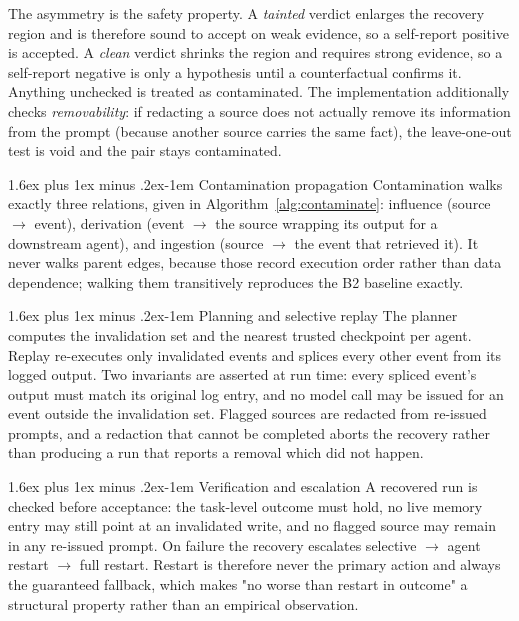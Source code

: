 \documentclass[10pt,twocolumn,a4paper]{article}
\makeatletter
\renewcommand{\subsubsection}{\@startsection{subsubsection}{3}{\z@}%
  {1.6ex plus 1ex minus .2ex}{-1em}%
  {\normalfont\normalsize\itshape}}
\newcommand{\btwo}{B2}
\makeatother
\begin{document}
The asymmetry is the safety property. A \textit{tainted} verdict enlarges the
recovery region and is therefore sound to accept on weak evidence, so a
self-report positive is accepted. A \textit{clean} verdict shrinks the region
and requires strong evidence, so a self-report negative is only a hypothesis
until a counterfactual confirms it. Anything unchecked is treated as
contaminated. The implementation additionally checks \emph{removability}: if
redacting a source does not actually remove its information from the prompt
(because another source carries the same fact), the leave-one-out test is void
and the pair stays contaminated.

\subsubsection{Contamination propagation}
\label{sec:prop}
Contamination walks exactly three relations, given in
Algorithm~\ref{alg:contaminate}: influence (source $\rightarrow$ event),
derivation (event $\rightarrow$ the source wrapping its output for a downstream
agent), and ingestion (source $\rightarrow$ the event that retrieved it). It
never walks parent edges, because those record execution order rather than data
dependence; walking them transitively reproduces the \btwo{} baseline exactly.

\subsubsection{Planning and selective replay}
The planner computes the invalidation set and the nearest trusted checkpoint
per agent. Replay re-executes only invalidated events and splices every other
event from its logged output. Two invariants are asserted at run time: every
spliced event's output must match its original log entry, and no model call may
be issued for an event outside the invalidation set. Flagged sources are
redacted from re-issued prompts, and a redaction that cannot be completed
aborts the recovery rather than producing a run that reports a removal which
did not happen.

\subsubsection{Verification and escalation}
\label{sec:verify}
A recovered run is checked before acceptance: the task-level outcome must hold,
no live memory entry may still point at an invalidated write, and no flagged
source may remain in any re-issued prompt. On failure the recovery escalates
selective $\rightarrow$ agent restart $\rightarrow$ full restart. Restart is
therefore never the primary action and always the guaranteed fallback, which
makes "no worse than restart in outcome" a structural property rather than an
empirical observation.
\end{document}
